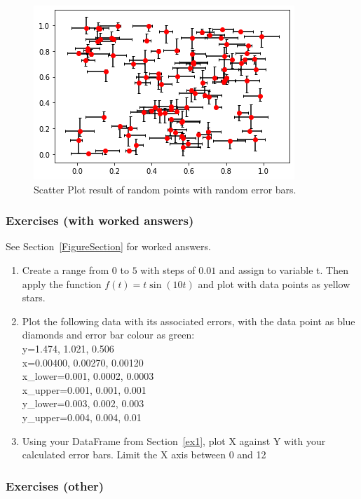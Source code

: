 \begin{itemize}
\begin{figure}[H]
	\centering
	\includegraphics[scale=0.75]{Pictures/Week6_random_scatter_w_rerrors2.png}
\caption{Scatter Plot result of random points with random error bars.}
\label{fig:peb3}
\end{figure}

\end{itemize}

\subsubsection{Exercises (with worked answers)}

See Section~\ref{FigureSection} for worked answers.

\begin{enumerate}
\item Create a range from $0$ to $5$ with steps of $0.01$ and assign to variable t. Then apply the function $f(t)= t\sin(10t)$ and plot with data points as yellow stars.
\item Plot the following data with its associated errors, with the data point as blue diamonds and error bar colour as green:\\
y=1.474, 1.021, 0.506\\
x=0.00400, 0.00270, 0.00120\\
x\_lower=0.001, 0.0002, 0.0003\\
x\_upper=0.001, 0.001, 0.001\\
y\_lower=0.003, 0.002, 0.003\\
y\_upper=0.004, 0.004, 0.01
\item Using your DataFrame from Section~\ref{ex1}, plot X against Y with your calculated error bars. Limit the X axis between 0 and 12
\end{enumerate}


\subsubsection{Exercises (other)}

